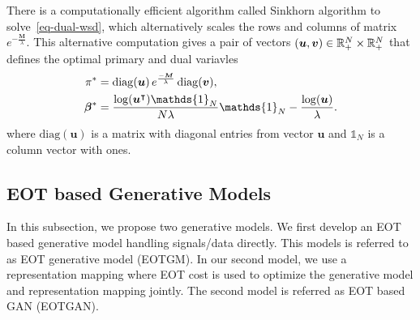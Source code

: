 There is a computationally efficient algorithm called Sinkhorn
algorithm\cite{2013arXiv1306.0895C, 2013arXiv1310.4375C} to
solve~\eqref{eq-dual-wsd}, which alternatively scales the rows and columns of matrix $e^{-\frac{\bm{M}}{\lambda}}$. This alternative computation gives a pair of vectors $(\bm{u}, \bm{v}) \in \mathbb{R}^N_{+} \times \mathbb{R}^N_{+}$ that defines the optimal primary and dual variavles \cite[Proposition~2]{2013arXiv1310.4375C} 
\begin{align}\label{eq-dual-opt}
  \pi^{\ast} &=
               \mathrm{diag}(\bm{u}) \, e^{\frac{-\bm{M}}{\la}} \, \mathrm{diag}(\bm{v}),  \nonumber \\
  \bm{\beta}^{\ast} &= \frac{\log(\bm{u}^{\intercal})\mathds{1}_N}{N\la} \mathds{1}_N -\frac{\log(\bm{u})}{\la}.
\end{align}
where $\mathrm{diag}(\bm{u})$ is a matrix with diagonal entries from vector $\bm{u}$ and $\mathds{1}_N$ is a column vector with ones.


\subsection{EOT based Generative Models}

In this subsection, we propose two generative models.
We first develop an EOT based generative model handling signals/data directly. This models is referred to as EOT generative model (EOTGM). 
In our second model, we use a
representation mapping where EOT cost is used to optimize the
generative model and representation mapping jointly. The second model is referred as EOT based GAN (EOTGAN).

